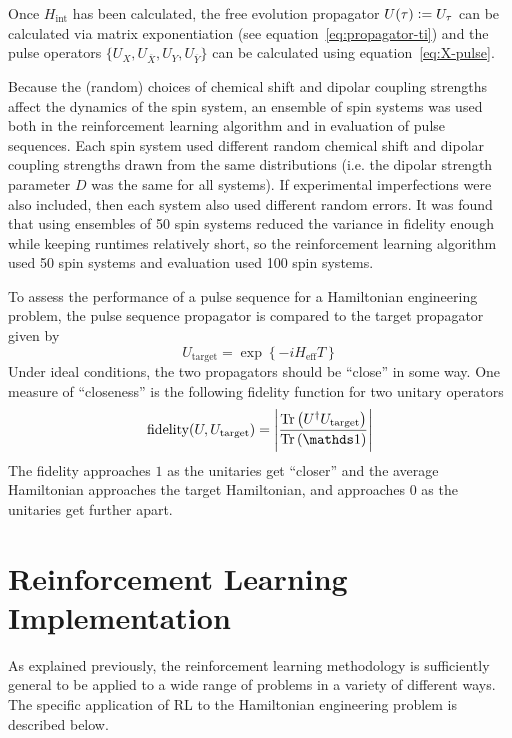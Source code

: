 
Once $H_{\text{int}}$ has been calculated, the free evolution propagator $U(\tau) \mathrel{\mathop:}= U_\tau$ can be calculated via matrix exponentiation (see equation~\ref{eq:propagator-ti})
and
the pulse operators $\{ U_X, U_{\overline{X}}, U_Y, U_{\overline{Y}} \}$ can be calculated using equation~\ref{eq:X-pulse}.

Because the (random) choices of chemical shift and dipolar coupling strengths affect the dynamics of the spin system, an ensemble of spin systems was used both in the reinforcement learning algorithm and in evaluation of pulse sequences.
Each spin system used different random chemical shift and dipolar coupling strengths drawn from the same distributions (i.e. the dipolar strength parameter $D$ was the same for all systems). If experimental imperfections were also included, then each system also used different random errors.
It was found that using ensembles of 50 spin systems reduced the variance in fidelity enough while keeping runtimes relatively short, so
the reinforcement learning algorithm used 50 spin systems and evaluation used 100 spin systems.

To assess the performance of a pulse sequence for a Hamiltonian engineering problem, the pulse sequence propagator is compared to the target propagator given by
\[
U_{\text{target}} = \exp\left\{ -i H_{\text{eff}} T \right\}
\]
Under ideal conditions, the two propagators should be ``close'' in some way. One measure of ``closeness'' is the following fidelity function for two unitary operators
\begin{equation}
    \text{fidelity}(U, U_\text{target}) = \left| \frac{\Tr{
        U^\dagger U_\text{target}
    }}{\Tr{\identity}} \right|
\end{equation}
The fidelity approaches $1$ as the unitaries get ``closer'' and the average Hamiltonian approaches the target Hamiltonian, and approaches $0$ as the unitaries get further apart.

\section{Reinforcement Learning Implementation}\label{sec:methods-RL}

As explained previously,
the reinforcement learning methodology is sufficiently general to be applied to a wide range of problems in a variety of different ways.  The specific application of RL to the Hamiltonian engineering problem is described below.

